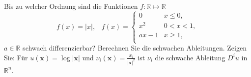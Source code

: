 Bis zu welcher Ordnung sind die Funktionen $f: \mathbb{R} \mapsto \mathbb{R}$
\begin{equation*}
    f(x) = |x|, \hspace{10pt} f(x) = 
    \begin{cases}
    0 & x \leq 0, \\
    x^2 & 0 < x < 1, \\
    ax - 1 & x \geq 1, \\
    \end{cases}
\end{equation*}
$a \in \mathbb{R}$ schwach differenzierbar? Berechnen Sie die schwachen Ableitungen.
Zeigen Sie: Für $u(\textbf{x}) = \log|\textbf{x}|$ und $\nu_i(\textbf{x}) = \frac{x_i}{|\textbf{x}|^2}$ ist $\nu_i$ die schwache Ableitung $D^iu$ in $\mathbb{R}^n$. 